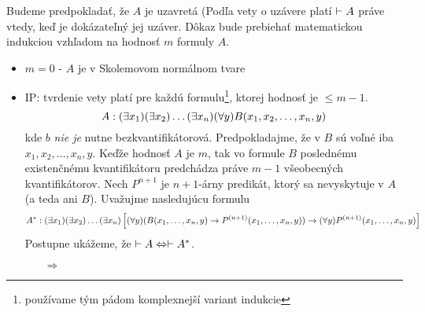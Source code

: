 \begin{dokaz}
    Budeme predpokladať, že $A$ je uzavretá (Podľa vety o uzávere
    platí $\vdash A$ práve vtedy, keď je dokázateľný jej uzáver.
    Dôkaz bude prebiehať matematickou indukciou vzhľadom na hodnosť
    $m$ formuly $A$.
    \begin{itemize}
        \item $m=0$ - $A$ je v Skolemovom normálnom tvare
        \item IP: tvrdenie vety platí pre každú
        formulu\footnote{používame tým pádom komplexnejší variant
        indukcie}, ktorej hodnosť je $\le m-1$.
        \begin{equation}
            A: (\exists x_1) (\exists x_2) \dots (\exists x_n) (\forall y) B(x_1,x_2,\dots,x_n,y)
        \end{equation}
        kde $b$ \emph{nie je} nutne bezkvantifikátorová.
        Predpokladajme, že v $B$ sú voľné iba $x_1,x_2,\dots,x_n,y$.
        Keďže hodnosť $A$ je $m$, tak vo formule $B$ poslednému
        existenčnému kvantifikátoru predchádza práve $m-1$ všeobecných
        kvantifikátorov.
        Nech $P^{n+1}$ je $n+1$-árny predikát, ktorý sa nevyskytuje v
        $A$ (a teda ani $B$). Uvažujme nasledujúcu formulu
        \begin{equation}
            A^*: (\exists x_1) (\exists x_2) \dots (\exists x_n) \left[
                (\forall y) (B(x_1,\dots,x_n,y) \rightarrow 
                    P^{(n+1)}(x_1,\dots,x_n,y)) \rightarrow 
                    (\forall y) P^{(n+1)} (x_1,\dots,x_n,y)
            \right]
        \end{equation}
        Postupne ukážeme, že $\vdash A \Leftrightarrow \vdash
        A^*$.
        \begin{itemize}
        \item[$\Rightarrow$]
\end{itemize}
\end{itemize}
\end{dokaz}

